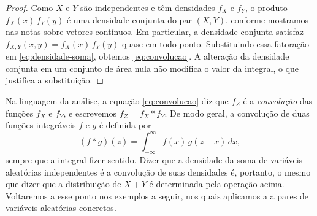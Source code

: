 \documentclass[12pt,portuguese]{article}
\theoremstyle{definition}
\theoremstyle{plainexercise}
\theoremstyle{starredexercise}
\theoremstyle{definition}
\begin{document}
\begin{proof}
  Como $X$ e $Y$ são independentes e têm densidades $f_X$ e $f_Y$, o
  produto $f_X(x)\,f_Y(y)$ é uma densidade conjunta do par $(X, Y)$, conforme
  mostramos nas notas sobre vetores contínuos. Em particular, a densidade
  conjunta satisfaz $f_{X,Y}(x, y) = f_X(x)\,f_Y(y)$ quase em todo ponto.
  Substituindo essa fatoração em \eqref{eq:densidade-soma}, obtemos
  \eqref{eq:convolucao}. A
  alteração da densidade conjunta em um conjunto de área nula não modifica o
  valor da integral, o que justifica a substituição.
\end{proof}

Na linguagem da análise, a equação \eqref{eq:convolucao} diz que $f_Z$ é a
\emph{convolução} das funções $f_X$ e $f_Y$, e escrevemos $f_Z = f_X * f_Y$.
De modo geral, a convolução de duas funções integráveis $f$ e $g$ é definida
por
\[
  (f * g)(z) = \int_{-\infty}^{\infty} f(x)\,g(z - x)\,dx,
\]
sempre que a integral fizer sentido. Dizer que a densidade da soma de variáveis
aleatórias independentes é a convolução de suas densidades é, portanto, o mesmo
que dizer que a distribuição de $X + Y$ é determinada pela operação acima.
Voltaremos a esse ponto nos exemplos a seguir, nos quais aplicamos a
 a pares de variáveis aleatórias concretos.
\end{document}
